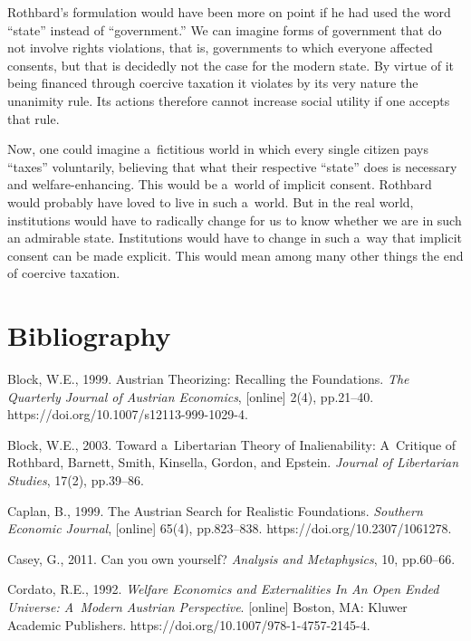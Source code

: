 Rothbard's formulation would have been more on point if he had used the word ``state'' instead of ``government.'' We can imagine forms of government that do not involve rights violations, that is, governments to which everyone affected consents, but that is decidedly not the case for the modern state. By virtue of it being financed through coercive taxation it violates by its very nature the unanimity rule. Its actions therefore cannot increase social utility if one accepts that rule.



Now, one could imagine a~fictitious world in which every single citizen pays ``taxes'' voluntarily, believing that what their respective ``state'' does is necessary and welfare-enhancing. This would be a~world of implicit consent. Rothbard would probably have loved to live in such a~world. But in the real world, institutions would have to radically change for us to know whether we are in such an admirable state. Institutions would have to change in such a~way that implicit consent can be made explicit. This would mean among many other things the end of coercive taxation.



\section{Bibliography}

Block, W.E., 1999. Austrian Theorizing: Recalling the Foundations. \textit{The Quarterly Journal of Austrian Economics}, [online] 2(4), pp.21–40. https://doi.org/10.1007/s12113-999-1029-4.



Block, W.E., 2003. Toward a~Libertarian Theory of Inalienability: A~Critique of Rothbard, Barnett, Smith, Kinsella, Gordon, and Epstein. \textit{Journal of Libertarian Studies}, 17(2), pp.39–86.



Caplan, B., 1999. The Austrian Search for Realistic Foundations. \textit{Southern Economic Journal}, [online] 65(4), pp.823–838. https://doi.org/10.2307/1061278.



Casey, G., 2011. Can you own yourself? \textit{Analysis and Metaphysics}, 10, pp.60–66.



Cordato, R.E., 1992. \textit{Welfare Economics and Externalities In An Open Ended Universe: A~Modern Austrian Perspective}. [online] Boston, MA: Kluwer Academic Publishers. https://doi.org/10.1007/978-1-4757-2145-4.




